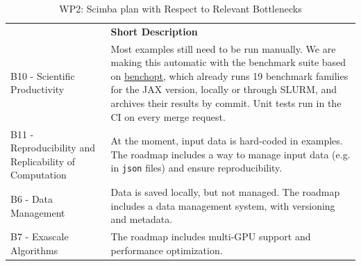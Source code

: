 \begin{table}[h!]
    \centering
    {
        \setlength{\parindent}{0pt}
        \def\arraystretch{1.25}
        {
            \fontsize{9}{11}\selectfont
            \begin{tabular}{!{\color{numpexgray}\vrule}p{.25\linewidth}!{\color{numpexgray}\vrule}p{.6885\linewidth}!{\color{numpexgray}\vrule}}

                 & {\rule{0pt}{2.5ex}\color{white}\bf Short Description } \\

                B10 - Scientific Productivity
                 & Most examples still need to be run manually.
                We are making this automatic with the benchmark suite
                based on \href{https://benchopt.github.io}{benchopt},
                which already runs 19 benchmark families
                for the JAX version, locally or through SLURM,
                and archives their results by commit.
                Unit tests run in the CI on every merge request.          \\
                B11 - Reproducibility and Replicability of Computation
                 & At the moment, input data is hard-coded in examples.
                The roadmap includes a way to manage input data
                (e.g. in \texttt{json} files)
                and ensure reproducibility.                               \\
                B6 - Data Management
                 & Data is saved locally, but not managed.
                The roadmap includes a data management system,
                with versioning and metadata.                             \\
                B7 - Exascale Algorithms
                 & The roadmap includes multi-GPU support
                and performance optimization.                             \\
            \end{tabular}
        }
    }
    \caption{WP2: Scimba plan with Respect to Relevant Bottlenecks}
    \label{tab:WP2:Scimba:bottlenecks}
\end{table}
